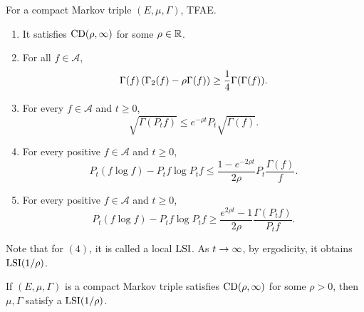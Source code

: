 \begin{prop}\label{prop:cd_lsi}
    For a compact Markov triple $(E,\mu,\Gamma)$, TFAE.
    \begin{enumerate}[label=(\arabic{*})]
        \item It satisfies $\operatorname{CD}(\rho,\infty)$ for some $\rho \in \mathbb{R}$.
        \item For all $f \in \mathcal{A}$,
        \begin{equation*}
            \Gamma(f)\left(\Gamma_2(f) - \rho\Gamma(f)\right) \geq \frac{1}{4}\Gamma(\Gamma(f)).
        \end{equation*}
        \item For every $f \in \mathcal{A}$ and $t \geq 0$,
        \begin{equation*}
            \sqrt{\Gamma(P_t f)} \leq e^{-\rho t}P_t \sqrt{\Gamma(f)}.
        \end{equation*}
        \item For every positive $f \in \mathcal{A}$ and $t \geq 0$,
        \begin{equation*}
            P_t(f \log f) - P_t f \log P_t f \leq \frac{1 - e^{-2\rho t}}{2\rho}P_t \frac{\Gamma(f)}{f}.
        \end{equation*}
        \item For every positive $f \in \mathcal{A}$ and $t \geq 0$,
        \begin{equation*}
            P_t(f \log f)-P_t f \log P_t f \geq \frac{e^{2 \rho t}-1}{2 \rho} \frac{\Gamma\left(P_t f\right)}{P_t f}.
        \end{equation*}
    \end{enumerate}
\end{prop}
Note that for $(4)$, it is called a local $\operatorname{LSI}$. As $t \rightarrow \infty$, by ergodicity, it obtains $\operatorname{LSI}(1 / \rho)$.
\begin{cor}
   If $(E,\mu,\Gamma)$ is a compact Markov triple satisfies $\operatorname{CD}(\rho,\infty)$ for some $\rho > 0$, then $\mu,\Gamma$ satisfy a $\operatorname{LSI}(1 / \rho)$. 
\end{cor}
